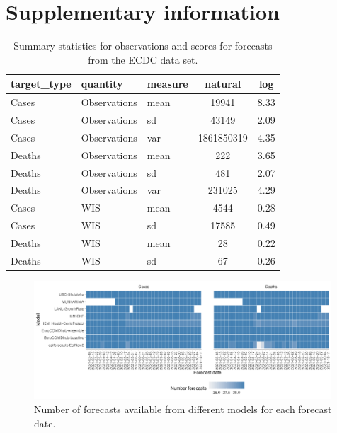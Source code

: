 \documentclass{article}
\begin{document}
\newpage

\appendix
\section{Supplementary information}

\begin{table}[h!]
    \centering
    
   \begin{tabular}{lllcc}
        \toprule
        target\_type & quantity & measure & natural & log\\
        \midrule
        Cases & Observations & mean & 19941 & 8.33\\
        Cases & Observations & sd & 43149 & 2.09\\
        Cases & Observations & var & 1861850319 & 4.35\\
        Deaths & Observations & mean & 222 & 3.65\\
        Deaths & Observations & sd & 481 & 2.07\\
        Deaths & Observations & var & 231025 & 4.29\\
        \addlinespace
        \hline
        \addlinespace
        Cases & WIS & mean & 4544 & 0.28\\
        Cases & WIS & sd & 17585 & 0.49\\
        Deaths & WIS & mean & 28 & 0.22\\
        Deaths & WIS & sd & 67 & 0.26\\
        \bottomrule
        \end{tabular}
    \caption{Summary statistics for observations and scores for forecasts from the ECDC data set.}
    \label{tab:HUB-summary}
\end{table}

\begin{figure}[h!]
    \centering
    \includegraphics[width=0.99\textwidth]{output/figures/number-avail-forecasts.png}
    \caption{
    Number of forecasts available from different models for each forecast date. 
    }
    \label{fig:HUB-num-avail-models}
\end{figure}
\end{document}
